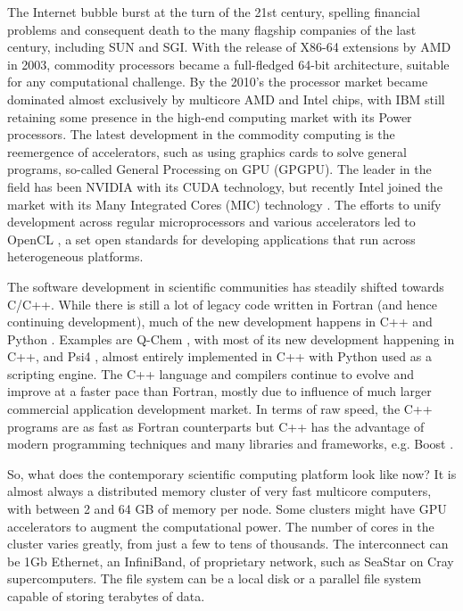 \documentclass[12pt]{book} \usepackage[margin=1in]{geometry}
\begin{document}
The Internet bubble burst at the turn of the 21st century, spelling
financial problems and consequent death to the many flagship companies
of the last century, including SUN and SGI.  With the release of
X86-64 extensions by AMD in 2003, commodity processors became a
full-fledged 64-bit architecture, suitable for any computational
challenge.  By the 2010's the processor market became dominated almost
exclusively by multicore AMD and Intel chips, with IBM still retaining
some presence in the high-end computing market with its Power
processors.  The latest development in the commodity computing is the
reemergence of accelerators, such as using graphics cards to solve
general programs, so-called General Processing on GPU (GPGPU).  The
leader in the field has been NVIDIA with its CUDA
\cite{heinecke2012gpgpu} technology, but recently Intel joined the
market with its Many Integrated Cores (MIC) technology
\cite{heinecke2012gpgpu}. The efforts to unify development
across regular microprocessors and various accelerators led to OpenCL
\cite{heinecke2012gpgpu}, a set open standards for developing
applications that run across heterogeneous platforms.

The software development in scientific communities has steadily shifted
towards C/C++.  While there is still a lot of legacy code written in
Fortran (and hence continuing development), much of the new
development happens in C++ and Python \cite{python}. Examples are
Q-Chem \cite{qchem}, with most of its new development happening in
C++, and Psi4 \cite{psi4}, almost entirely implemented in C++ with
Python used as a scripting engine.  The C++ language and compilers
continue to evolve and improve at a faster pace than Fortran, mostly due
to influence of much larger commercial application development market.
In terms of raw speed, the C++ programs are as fast as Fortran
counterparts but C++ has the advantage of modern programming
techniques and many libraries and frameworks, e.g. Boost \cite{boost}.

So, what does the contemporary scientific computing platform look like
now?  It is almost always a distributed memory cluster of very fast
multicore computers, with between 2 and 64 GB of memory per
node.  Some clusters might have GPU accelerators to augment the
computational power. The number of cores in the cluster varies
greatly, from just a few to tens of thousands.  The interconnect can
be 1Gb Ethernet, an InfiniBand, of proprietary network, such as
SeaStar on Cray supercomputers.  The file system can be a local disk or
a parallel file system capable of storing terabytes of data.
\end{document}
